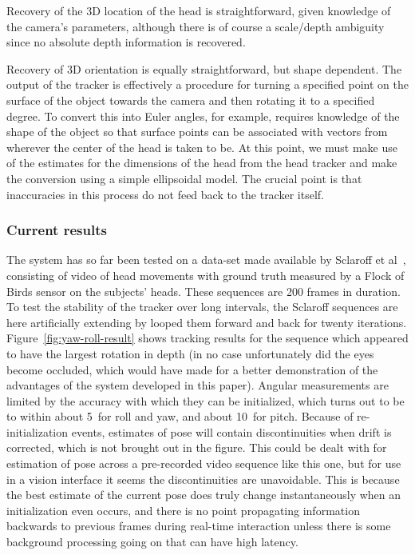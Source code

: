 Recovery of the 3D location of the head is straightforward, given
knowledge of the camera's parameters, although there is of course a
scale/depth ambiguity since no absolute depth information is
recovered.

Recovery of 3D orientation is equally straightforward, but shape
dependent.  The output of the tracker is effectively a procedure for
turning a specified point on the surface of the object towards the
camera and then rotating it to a specified degree.  To convert this
into Euler angles, for example, requires knowledge of the shape of the
object so that surface points can be associated with vectors from
wherever the center of the head is taken to be.  At this point, we
must make use of the estimates for the dimensions of the head from the
head tracker and make the conversion using a simple ellipsoidal model.
The crucial point is that inaccuracies in this process do not feed
back to the tracker itself.

\subsubsection*{Current results}

The system has so far been tested on a data-set made available by
Sclaroff et al~\cite{lacascia00fast}, consisting of video of head
movements with ground truth measured by a Flock of Birds sensor on the
subjects' heads.  These sequences are 200 frames in duration.  To test
the stability of the tracker over long intervals, the Sclaroff
sequences are here artificially extending by looped them forward and
back for twenty iterations.  Figure~\ref{fig:yaw-roll-result} shows
tracking results for the sequence which appeared to have the largest
rotation in depth (in no case unfortunately did the eyes become
occluded, which would have made for a better demonstration of the
advantages of the system developed in this paper).  Angular
measurements are limited by the accuracy with which they can be
initialized, which turns out to be to within about 5\dgrs\ for roll and
yaw, and about 10\dgrs\ for pitch.  Because of re-initialization
events, estimates of pose will contain discontinuities when drift is
corrected, which is not brought out in the figure.  This could be
dealt with for estimation of pose across a pre-recorded video sequence
like this one, but for use in a vision interface it seems the
discontinuities are unavoidable.  This is because the best estimate of
the current pose does truly change instantaneously when an
initialization even occurs, and there is no point propagating
information backwards to previous frames during real-time interaction
unless there is some background processing going on that can have high
latency.

